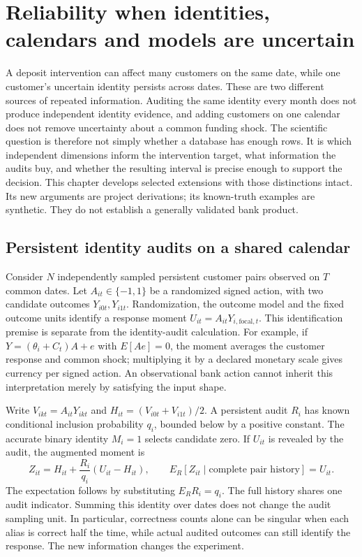 \chapter{Reliability when identities, calendars and models are uncertain}
\label{r8:reliability}

A deposit intervention can affect many customers on the same date, while one
customer's uncertain identity persists across dates. These are two different
sources of repeated information. Auditing the same identity every month does
not produce independent identity evidence, and adding customers on one calendar
does not remove uncertainty about a common funding shock. The scientific
question is therefore not simply whether a database has enough rows. It is
which independent dimensions inform the intervention target, what information
the audits buy, and whether the resulting interval is precise enough to support
the decision. This chapter develops selected extensions with those distinctions
intact. Its new arguments are project derivations; its known-truth examples are
synthetic. They do not establish a generally validated bank product.

\section{Persistent identity audits on a shared calendar}
\label{r8:joint}

Consider $N$ independently sampled persistent customer pairs observed on $T$
common dates. Let $A_{it}\in\{-1,1\}$ be a randomized signed action, with two
candidate outcomes $Y_{i0t},Y_{i1t}$. Randomization, the outcome model and the
fixed outcome units identify a response moment $U_{it}=A_{it}Y_{i,\mathrm{focal},t}$.
This identification premise is separate from the identity-audit calculation.
For example, if $Y=(\theta_i+C_t)A+e$ with $E[Ae]=0$, the moment averages the
customer response and common shock; multiplying it by a declared monetary
scale gives currency per signed action. An observational bank action cannot
inherit this interpretation merely by satisfying the input shape.

Write $V_{ikt}=A_{it}Y_{ikt}$ and $H_{it}=(V_{i0t}+V_{i1t})/2$.
A persistent audit $R_i$ has known conditional inclusion probability $q_i$,
bounded below by a positive constant. The accurate binary identity $M_i=1$
selects candidate zero. If $U_{it}$ is revealed by the audit, the augmented
moment is
\begin{equation}
 Z_{it}=H_{it}+\frac{R_i}{q_i}(U_{it}-H_{it}),\qquad
 E_R[Z_{it}\mid\text{complete pair history}]=U_{it}.
 \label{r8:audit-moment}
\end{equation}
The expectation follows by substituting $E_RR_i=q_i$. The full history shares
one audit indicator. Summing this identity over dates does not change the audit
sampling unit. In particular, correctness counts alone can be singular when
each alias is correct half the time, while actual audited outcomes can still
identify the response. The new information changes the experiment.

